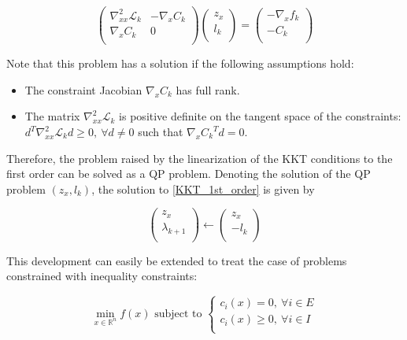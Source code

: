 \begin{equation}
  \begin{pmatrix}
      \nabla_{xx}^2\mathcal{L}_k & -\nabla_x C_k\\
      \nabla_x C_k & 0\\
  \end{pmatrix}
  \begin{pmatrix}
      z_x\\
      l_k\\
  \end{pmatrix}
  =
  \begin{pmatrix}
      - \nabla_{x}f_k\\
      - C_k\\
  \end{pmatrix}
\end{equation}

Note that this problem has a solution if the following assumptions hold:
\begin{itemize}
  \item The constraint Jacobian $\nabla_x C_k$ has full rank.
  \item The matrix $\nabla_{xx}^2\mathcal{L}_k$ is positive definite on the tangent space of the constraints:\\ $d^T\nabla_{xx}^2\mathcal{L}_k d \geq 0,\ \forall d\neq 0$ such that ${\nabla_x C_k}^T d = 0$.
\end{itemize}

Therefore, the problem raised by the linearization of the KKT conditions to the first order can be solved as a QP problem.
Denoting the solution of the QP problem $(z_x, l_k)$, the solution to \ref{KKT_1st_order} is given by

\begin{equation}
  \begin{pmatrix}
      z_x\\
      \lambda_{k+1}\\
  \end{pmatrix}
  \leftarrow
  \begin{pmatrix}
      z_x\\
      -l_k\\
  \end{pmatrix}
\end{equation}

This development can easily be extended to treat the case of problems constrained with inequality constraints:

\begin{equation}
  \min_{x\in\mathbb{R}^n}{f(x)} \text{ subject to }
  \left\{
  \begin{array}{l}
    c_i(x) = 0,\ \forall i\in{E}\\
    c_i(x) \geq 0,\ \forall i\in{I}\\
  \end{array}
  \right.
\end{equation}

